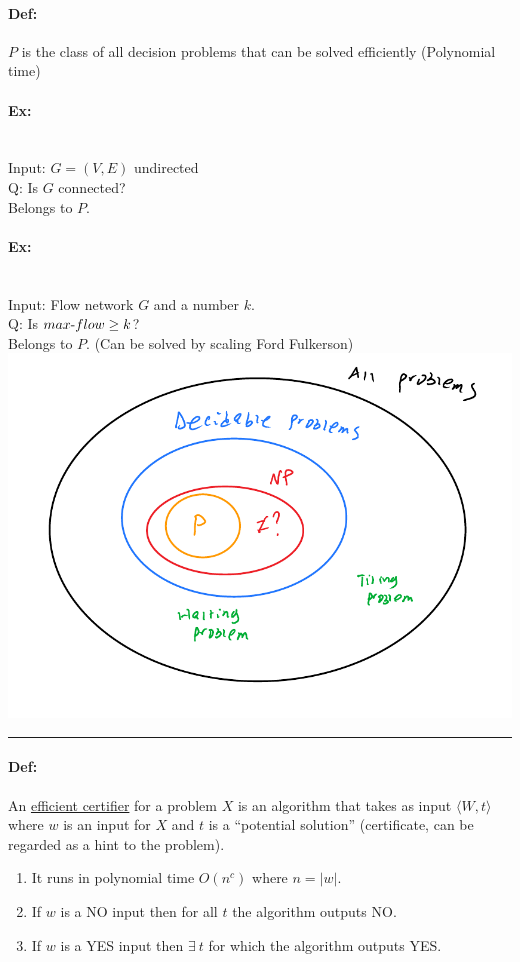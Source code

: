 \documentclass[12 pt]{article}
\begin{document}
          \paragraph{Def:} $P$ is the class of all decision problems
          that can be solved efficiently (Polynomial time)
          \paragraph{Ex:} ~
          \\ Input: $G=(V,E)$ undirected
          \\ Q: Is $G$ connected?
          \\ Belongs to $P$.
          \paragraph{Ex:}~
          \\ Input: Flow network $G$ and a number $k$.
          \\ Q: Is $max\hbox{-}flow \geq k$?
          \\ Belongs to $P$. (Can be solved by scaling Ford Fulkerson)
          \\ \includegraphics[width=.9\textwidth]{i116.pdf}
          \\ \noindent \rule{\textwidth}{0.5pt}
          \paragraph{Def:} An \underline{efficient certifier} for a
          problem $X$ is an algorithm that takes as input $\langle W,
          t \rangle$ where $w$ is an input for $X$ and $t$ is a
          ``potential solution'' (certificate, can be regarded as a
          hint to the problem).
          \begin{enumerate}
          \item It runs in polynomial time $O(n^c)$ where
            $n=\left|w\right|$.
          \item If $w$ is a NO input then for all $t$ the algorithm
            outputs NO.
          \item If $w$ is a YES input then $\exists \ t$ for which the
            algorithm outputs YES.
          \end{enumerate}
\end{document}
